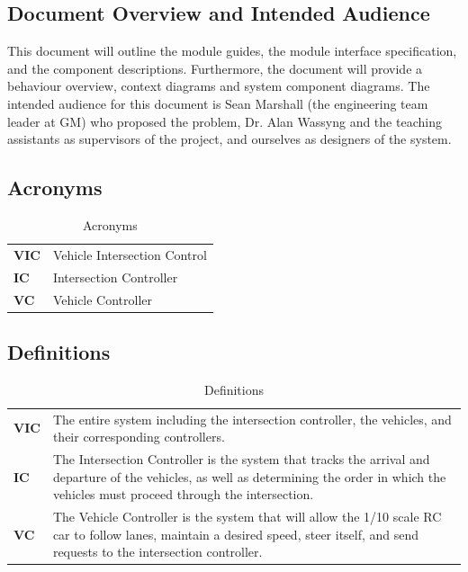 \documentclass [10pt]{article}
\begin{document}
\subsection{Document Overview and Intended Audience}
This document will outline the module guides, the module interface specification, and the component descriptions. Furthermore, the document will provide a behaviour overview, context diagrams and system component diagrams. The intended audience for this document is Sean Marshall (the engineering team leader at GM) who proposed the problem, Dr. Alan Wassyng and the teaching assistants as supervisors of the project, and ourselves as designers of the system. 

 

\subsection{Acronyms}

\begin{longtable}{ |p{ } p{ }|} \caption{Acronyms} \\ \hline


\textbf{VIC} & Vehicle Intersection Control \\ 

\cellcolor{tableCell}\textbf{IC}  & \cellcolor{tableCell}Intersection Controller \\

\textbf{VC} &Vehicle Controller\\\hline


\end{longtable}

\subsection{Definitions}

\begin{longtable}{ |p{ } p{ }|} \caption{Definitions} \\ \hline


\textbf{VIC} & The entire system including the intersection controller, the vehicles, and their corresponding controllers. \\ 

\cellcolor{tableCell}\textbf{IC}  & \cellcolor{tableCell}The Intersection Controller is the system that tracks the arrival and departure of the vehicles, as well as determining the order in which the vehicles must proceed through the intersection.\\

\textbf{VC} & The Vehicle Controller is the system that will allow the 1/10 scale RC car to follow lanes, maintain a desired speed, steer itself, and send requests to the intersection controller. \\\hline


\end{longtable}
\end{document}
